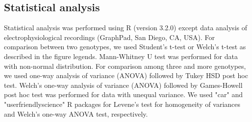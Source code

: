 \subsection*{Statistical analysis}

Statistical analysis was performed using R (version 3.2.0)\cite{R} except data analysis of electrophysiological recordings (GraphPad, San Diego, CA, USA).
For comparison between two genotypes, we used Student's t-test or Welch's t-test as described in the figure legends.
Mann-Whitney U test was performed for data with non-normal distribution.
For comparison among three and more genotypes, we used one-way analysis of variance (ANOVA) followed by Tukey HSD post hoc test. 
Welch's one-way analysis of variance (ANOVA) followed by Games-Howell post hoc test was performed for data with unequal variance.
We used "car"\cite{car} and "userfriendlyscience"\cite{user} R packages for Levene's test for homogeneity of variances and Welch's one-way ANOVA test, respectively. 
  
  
  
  
  
  
  
  
  
  